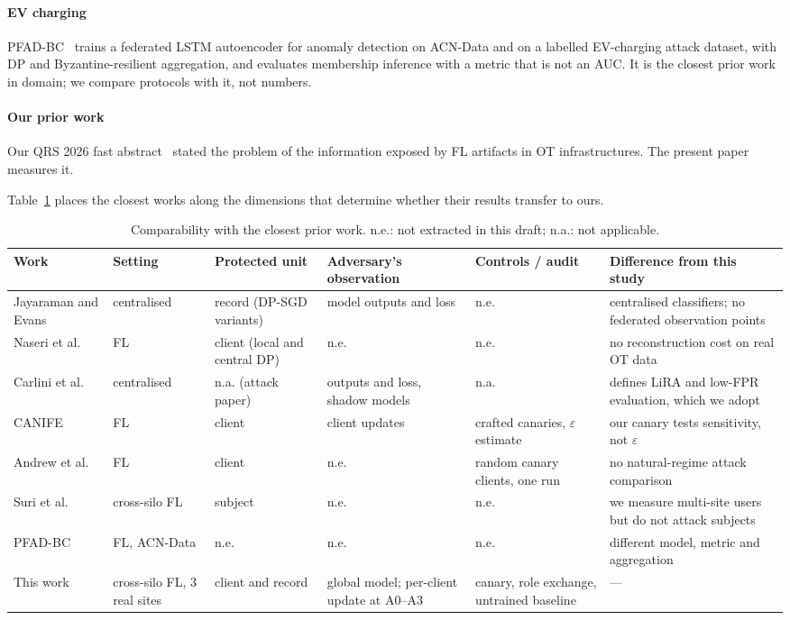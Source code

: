 \paragraph{EV charging} PFAD-BC~\cite{aldweesh2026pfadbc} trains a federated
LSTM autoencoder for anomaly detection on ACN-Data and on a labelled
EV-charging attack dataset, with DP and Byzantine-resilient aggregation, and
evaluates membership inference with a metric that is not an AUC. It is the
closest prior work in domain; we compare protocols with it, not numbers.

\paragraph{Our prior work} Our QRS 2026 fast abstract~\cite{imperatrice2026toward}
stated the problem of the information exposed by FL artifacts in OT
infrastructures. The present paper measures it.

Table~\ref{tab:comparability} places the closest works along the dimensions
that determine whether their results transfer to ours.

\begin{table}[t]
\centering
\caption{Comparability with the closest prior work. n.e.: not extracted in
this draft; n.a.: not applicable.}
\label{tab:comparability}
\footnotesize
\begin{tabular}{@{}p{2.6cm}p{2.0cm}p{2.3cm}p{3.1cm}p{2.6cm}p{3.3cm}@{}}
\toprule
Work & Setting & Protected unit & Adversary's observation & Controls / audit & Difference from this study \\
\midrule
Jayaraman and Evans~\cite{jayaraman2019evaluating} & centralised & record (DP-SGD variants) & model outputs and loss & n.e. & centralised classifiers; no federated observation points \\
Naseri et al.~\cite{naseri2022local} & FL & client (local and central DP) & n.e. & n.e. & no reconstruction cost on real OT data \\
Carlini et al.~\cite{carlini2022membership} & centralised & n.a. (attack paper) & outputs and loss, shadow models & n.a. & defines LiRA and low-FPR evaluation, which we adopt \\
CANIFE~\cite{maddock2023canife} & FL & client & client updates & crafted canaries, $\varepsilon$ estimate & our canary tests sensitivity, not $\varepsilon$ \\
Andrew et al.~\cite{andrew2024oneshot} & FL & client & n.e. & random canary clients, one run & no natural-regime attack comparison \\
Suri et al.~\cite{suri2022subject} & cross-silo FL & subject & n.e. & n.e. & we measure multi-site users but do not attack subjects \\
PFAD-BC~\cite{aldweesh2026pfadbc} & FL, ACN-Data & n.e. & n.e. & n.e. & different model, metric and aggregation \\
This work & cross-silo FL, 3 real sites & client and record & global model; per-client update at A0--A3 & canary, role exchange, untrained baseline & --- \\
\bottomrule
\end{tabular}
\end{table}

